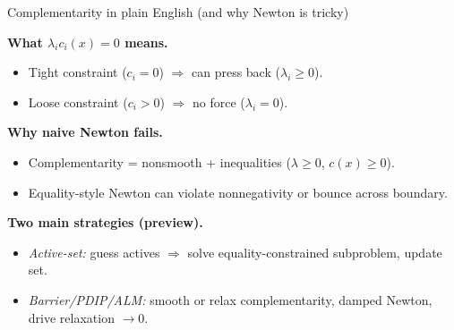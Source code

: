 \begin{frame}{Complementarity in plain English (and why Newton is tricky)}
\footnotesize

\textbf{What $\lambda_i c_i(x)=0$ means.}
\begin{itemize}
\item Tight constraint ($c_i=0$) $\Rightarrow$ can press back ($\lambda_i\ge0$).
\item Loose constraint ($c_i>0$) $\Rightarrow$ no force ($\lambda_i=0$).
\end{itemize}

\textbf{Why naive Newton fails.}
\begin{itemize}
\item Complementarity = nonsmooth + inequalities ($\lambda\ge0$, $c(x)\ge0$).
\item Equality-style Newton can violate nonnegativity or bounce across boundary.
\end{itemize}

\textbf{Two main strategies (preview).}
\begin{itemize}
\item \emph{Active-set:} guess actives $\Rightarrow$ solve equality-constrained subproblem, update set.
\item \emph{Barrier/PDIP/ALM:} smooth or relax complementarity, damped Newton, drive relaxation $\to 0$.
\end{itemize}
\end{frame}



 